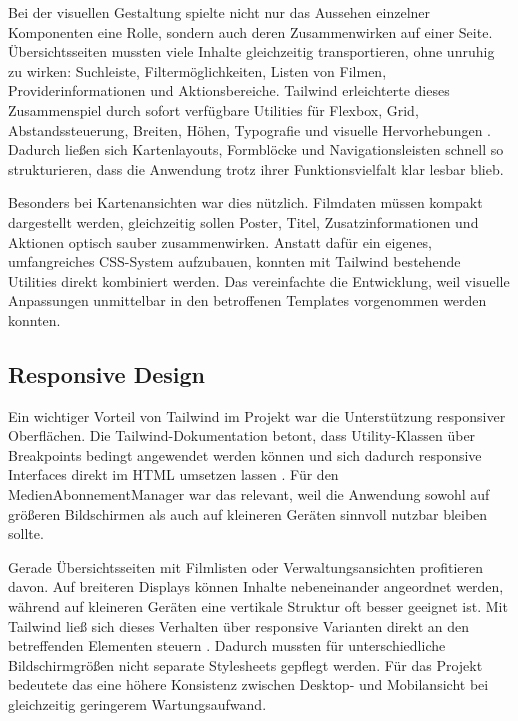 Bei der visuellen Gestaltung spielte nicht nur das Aussehen einzelner Komponenten eine Rolle, sondern auch deren Zusammenwirken auf einer Seite. \"Ubersichtsseiten mussten viele Inhalte gleichzeitig transportieren, ohne unruhig zu wirken: Suchleiste, Filterm\"oglichkeiten, Listen von Filmen, Providerinformationen und Aktionsbereiche. Tailwind erleichterte dieses Zusammenspiel durch sofort verf\"ugbare Utilities f\"ur Flexbox, Grid, Abstandssteuerung, Breiten, H\"ohen, Typografie und visuelle Hervorhebungen \cite{tailwind_utility}. Dadurch lie\ss{}en sich Kartenlayouts, Formbl\"ocke und Navigationsleisten schnell so strukturieren, dass die Anwendung trotz ihrer Funktionsvielfalt klar lesbar blieb.

Besonders bei Kartenansichten war dies n\"utzlich. Filmdaten m\"ussen kompakt dargestellt werden, gleichzeitig sollen Poster, Titel, Zusatzinformationen und Aktionen optisch sauber zusammenwirken. Anstatt daf\"ur ein eigenes, umfangreiches CSS-System aufzubauen, konnten mit Tailwind bestehende Utilities direkt kombiniert werden. Das vereinfachte die Entwicklung, weil visuelle Anpassungen unmittelbar in den betroffenen Templates vorgenommen werden konnten.

\subsection{Responsive Design}
Ein wichtiger Vorteil von Tailwind im Projekt war die Unterst\"utzung responsiver Oberfl\"achen. Die Tailwind-Dokumentation betont, dass Utility-Klassen \"uber Breakpoints bedingt angewendet werden k\"onnen und sich dadurch responsive Interfaces direkt im HTML umsetzen lassen \cite{tailwind_responsive}. F\"ur den MedienAbonnementManager war das relevant, weil die Anwendung sowohl auf gr\"o\ss{}eren Bildschirmen als auch auf kleineren Ger\"aten sinnvoll nutzbar bleiben sollte.

Gerade \"Ubersichtsseiten mit Filmlisten oder Verwaltungsansichten profitieren davon. Auf breiteren Displays k\"onnen Inhalte nebeneinander angeordnet werden, w\"ahrend auf kleineren Ger\"aten eine vertikale Struktur oft besser geeignet ist. Mit Tailwind lie\ss{} sich dieses Verhalten \"uber responsive Varianten direkt an den betreffenden Elementen steuern \cite{tailwind_responsive}. Dadurch mussten f\"ur unterschiedliche Bildschirmgr\"o\ss{}en nicht separate Stylesheets gepflegt werden. F\"ur das Projekt bedeutete das eine h\"ohere Konsistenz zwischen Desktop- und Mobilansicht bei gleichzeitig geringerem Wartungsaufwand.

